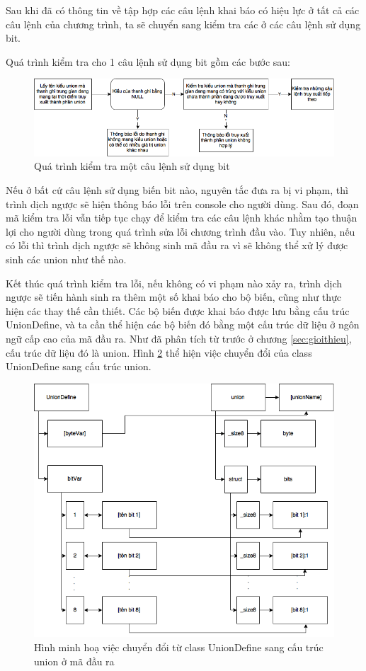 Sau khi đã có thông tin về tập hợp các câu lệnh khai báo có hiệu lực ở tất cả các câu lệnh của chương trình, ta sẽ chuyển sang kiểm tra các ở các câu lệnh sử dụng bit.

Quá trình kiểm tra cho 1 câu lệnh sử dụng bit gồm các bước sau:

\begin{figure}
	\centering
	\includegraphics[width=0.7\linewidth]{image/checkUnionSteps}
	\caption{Quá trình kiểm tra một câu lệnh sử dụng bit}
	\label{fig:checkunionsteps}
\end{figure}

Nếu ở bất cứ câu lệnh sử dụng biến bit nào, nguyên tắc đưa ra bị vi phạm, thì trình dịch ngược sẽ hiện thông báo lỗi trên console cho người dùng. Sau đó, đoạn mã kiểm tra lỗi vẫn tiếp tục chạy để kiểm tra các câu lệnh khác nhằm tạo thuận lợi cho người dùng trong quá trình sửa lỗi chương trình đầu vào. Tuy nhiên, nếu có lỗi thì trình dịch ngược sẽ không sinh mã đầu ra vì sẽ không thể xử lý được sinh các union như thế nào.


Kết thúc quá trình kiểm tra lỗi, nếu không có vi phạm nào xảy ra, trình dịch ngược sẽ tiến hành sinh ra thêm một số khai báo cho bộ biến, cũng như thực hiện các thay thế cần thiết. Các bộ biến được khai báo được lưu bằng cấu trúc UnionDefine, và ta cần thể hiện các bộ biến đó bằng một cấu trúc dữ liệu ở ngôn ngữ cấp cao của mã đầu ra. Như đã phân tích từ trước ở chương \ref{sec:gioithieu}, cấu trúc dữ liệu đó là union. Hình \ref{fig:uniondefinemapping} thể hiện việc chuyển đổi của class UnionDefine sang cấu trúc union.

\begin{figure}
	\centering
	\includegraphics[width=0.7\linewidth]{image/unionDefineMapping}
	\caption{Hình minh hoạ việc chuyển đổi từ class UnionDefine sang cấu trúc union ở mã đầu ra}
	\label{fig:uniondefinemapping}
\end{figure}

